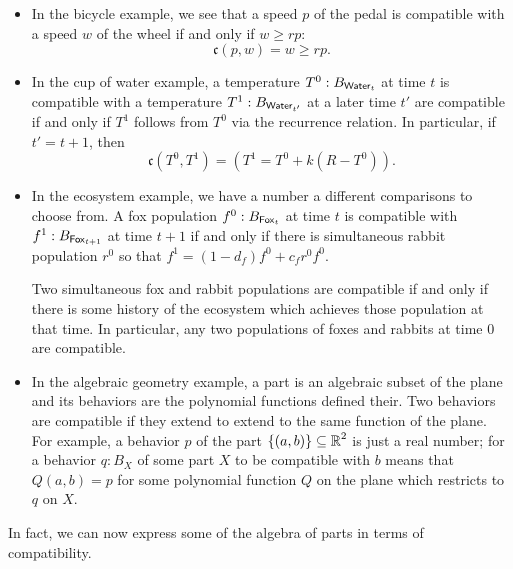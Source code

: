 \begin{ex}
\begin{itemize}
\item In the bicycle example, we see that a speed $p$ of the pedal is compatible with a speed $w$ of the wheel if and only if $w \geq rp$:
$$\mathfrak{c}(p, w) = w \geq rp.$$

\item In the cup of water example, a temperature $T^0 : B_{\mathsf{{Water}}_t}$ at time $t$ is compatible with a temperature $T^1 : B_{\mathsf{{Water}}_{t'}}$ at a later time $t'$ are compatible if and only if $T^1$ follows from $T^0$ via the recurrence relation. In particular, if $t' = t + 1$, then
$$\mathfrak{c}(T^0, T^1) = (T^1 = T^0 + k(R - T^0)).$$

\item In the ecosystem example, we have a number a different comparisons to choose from. A fox population $f^0 : B_{\mathsf{{Fox}}_t}$ at time $t$ is compatible with $f^1 : B_{\mathsf{{Fox}}_{t + 1}}$ at time $t + 1$ if and only if there is simultaneous rabbit population $r^0$ so that $f^1 = (1 - d_f)f^0 + c_f r^0 f^0$. 

Two simultaneous fox and rabbit populations are compatible if and only if there is some history of the ecosystem which achieves those population at that time. In particular, any two populations of foxes and rabbits at time $0$ are compatible.

\item In the algebraic geometry example, a part is an algebraic subset of the plane and its behaviors are the polynomial functions defined their. Two behaviors are compatible if they extend to extend to the same function of the plane. For example, a behavior $p$ of the part $\{(a, b)\} \subseteq \operatorname{\mathbb{R}}^2$ is just a real number; for a behavior $q : B_X$ of some part $X$ to be compatible with $b$ means that $Q(a, b) = p$ for some polynomial function $Q$ on the plane which restricts to $q$ on $X$.
\end{itemize}
\end{ex}

In fact, we can now express some of the algebra of parts in terms of compatibility.

